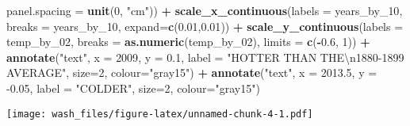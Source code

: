 \documentclass[]{article}
\newenvironment{Shaded}{\begin{snugshade}}{\end{snugshade}}
\newcommand{\CharTok}[1]{\textcolor[rgb]{0.31,0.60,0.02}{#1}}
\newcommand{\DataTypeTok}[1]{\textcolor[rgb]{0.13,0.29,0.53}{#1}}
\newcommand{\DecValTok}[1]{\textcolor[rgb]{0.00,0.00,0.81}{#1}}
\newcommand{\FloatTok}[1]{\textcolor[rgb]{0.00,0.00,0.81}{#1}}
\newcommand{\KeywordTok}[1]{\textcolor[rgb]{0.13,0.29,0.53}{\textbf{#1}}}
\newcommand{\NormalTok}[1]{#1}
\newcommand{\OperatorTok}[1]{\textcolor[rgb]{0.81,0.36,0.00}{\textbf{#1}}}
\newcommand{\StringTok}[1]{\textcolor[rgb]{0.31,0.60,0.02}{#1}}
\begin{document}
\begin{Shaded}
\begin{Highlighting}[]
        \DataTypeTok{panel.spacing =} \KeywordTok{unit}\NormalTok{(}\DecValTok{0}\NormalTok{, }\StringTok{"cm"}\NormalTok{)) }\OperatorTok{+}
\StringTok{  }\KeywordTok{scale_x_continuous}\NormalTok{(}\DataTypeTok{labels =}\NormalTok{ years_by_}\DecValTok{10}\NormalTok{, }\DataTypeTok{breaks =}\NormalTok{ years_by_}\DecValTok{10}\NormalTok{, }\DataTypeTok{expand=}\KeywordTok{c}\NormalTok{(}\FloatTok{0.01}\NormalTok{,}\FloatTok{0.01}\NormalTok{)) }\OperatorTok{+}
\StringTok{  }\KeywordTok{scale_y_continuous}\NormalTok{(}\DataTypeTok{labels =}\NormalTok{ temp_by_}\DecValTok{02}\NormalTok{, }\DataTypeTok{breaks =} \KeywordTok{as.numeric}\NormalTok{(temp_by_}\DecValTok{02}\NormalTok{), }\DataTypeTok{limits =} \KeywordTok{c}\NormalTok{(}\OperatorTok{-}\FloatTok{0.6}\NormalTok{, }\DecValTok{1}\NormalTok{)) }\OperatorTok{+}
\StringTok{  }\KeywordTok{annotate}\NormalTok{(}\StringTok{"text"}\NormalTok{, }\DataTypeTok{x =} \DecValTok{2009}\NormalTok{, }\DataTypeTok{y =} \FloatTok{0.1}\NormalTok{, }\DataTypeTok{label =} \StringTok{"HOTTER THAN THE}\CharTok{\textbackslash{}n}\StringTok{1880-1899 AVERAGE"}\NormalTok{, }\DataTypeTok{size=}\DecValTok{2}\NormalTok{, }\DataTypeTok{colour=}\StringTok{"gray15"}\NormalTok{) }\OperatorTok{+}
\StringTok{  }\KeywordTok{annotate}\NormalTok{(}\StringTok{"text"}\NormalTok{, }\DataTypeTok{x =} \FloatTok{2013.5}\NormalTok{, }\DataTypeTok{y =} \FloatTok{-0.05}\NormalTok{, }\DataTypeTok{label =} \StringTok{"COLDER"}\NormalTok{, }\DataTypeTok{size=}\DecValTok{2}\NormalTok{, }\DataTypeTok{colour=}\StringTok{"gray15"}\NormalTok{)}
\end{Highlighting}
\end{Shaded}

\texttt{[image: wash\_files/figure-latex/unnamed-chunk-4-1.pdf]}
\end{document}
